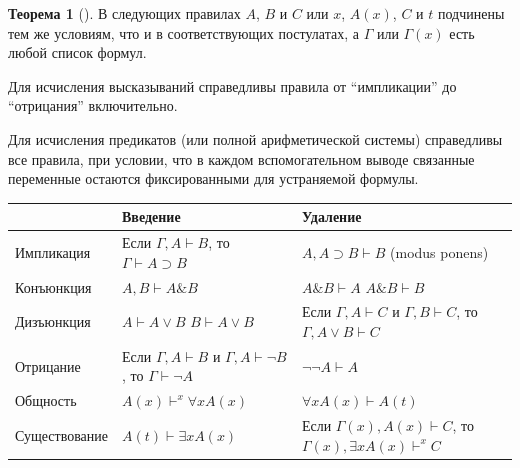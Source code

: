 \documentclass[a4paper, 12pt]{article}  %
\DeclareMathOperator{\conj}{\mathbb{\&}}
\theoremstyle{definition}
\newtheorem{theorem}{Теорема}
\begin{document}
	\begin{theorem}[]
		В следующих правилах $A$, $B$ и $C$ или $x$, $A(x)$, $C$ и $t$ подчинены тем же 
		условиям, что и в соответствующих постулатах, а $\Gamma$ или $\Gamma(x)$ есть 
		любой список формул. 
		
		Для исчисления высказываний справедливы
		правила от ``импликации'' до ``отрицания'' включительно.
		
		Для исчисления предикатов (или полной арифметической системы) справедливы все 
		правила, при условии, что в каждом вспомогательном выводе связанные переменные
		остаются фиксированными для устраняемой формулы.
		
		\begin{center}
			\begin{tabular}{ | m{3cm} | m{5.2cm}| m{5cm} | }
				\hline
							& Введение & Удаление \\ 
				\hline
				Импликация 	& Если $\Gamma, A \vdash B$, \newline то $\Gamma \vdash A 
							\supset B$    
							& $A, A \supset B \vdash B$ \newline (modus ponens) \\
				\hline
				Конъюнкция 	& $A, B \vdash A \conj B$ 
							& $A \conj B \vdash A$ \newline $A \conj B \vdash B$ \\
				\hline
				Дизъюнкция 	& $A \vdash A \vee B$ \newline $B \vdash A \vee B$ 
							& Если $\Gamma, A \vdash C$ и $\Gamma, B \vdash C$, \newline то
							$\Gamma, A \vee B \vdash C$ \\
				\hline
				Отрицание  	& Если $\Gamma, A \vdash B$ и $\Gamma, A \vdash \neg B$, 
							\newline то $\Gamma \vdash \neg A$ 
							& $\neg \neg A \vdash A$ \\
				\hline
				Общность   	& $A(x) \vdash^x \forall x A(x)$ 
							& $\forall x A(x) \vdash A(t)$ \\
				\hline
				Существование & $A(t) \vdash \exists x A(x)$ 
							& Если $\Gamma(x), A(x) \vdash C$, \newline то $\Gamma(x), \exists x A(x) \vdash^x C$ \\
				\hline
			\end{tabular}
		\end{center}  
	\end{theorem}

	\newpage
	
\end{document}

